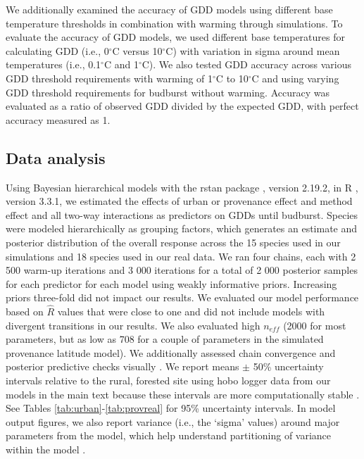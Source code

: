 \documentclass{article}\usepackage[]{graphicx}\usepackage[]{color}
\begin{document}
We additionally examined the accuracy of GDD models using different base temperature thresholds in combination with warming through simulations. To evaluate the accuracy of GDD models, we used different base temperatures for calculating GDD (i.e., 0$^{\circ}$C versus 10$^{\circ}$C) with variation in sigma around mean temperatures (i.e., 0.1$^{\circ}$C and 1$^{\circ}$C). We also tested GDD accuracy across various GDD threshold requirements with warming of 1$^{\circ}$C to 10$^{\circ}$C and using varying GDD threshold requirements for budburst without warming. Accuracy was evaluated as a ratio of observed GDD divided by the expected GDD, with perfect accuracy measured as 1.

\subsection*{Data analysis}
Using Bayesian hierarchical models with the rstan package \citep{rstan2019}, version 2.19.2,  in R \citep{R}, version 3.3.1, we estimated the effects of urban or provenance effect and method effect and all two-way interactions as predictors on GDDs until budburst. Species were modeled hierarchically as grouping factors, which generates an estimate and posterior distribution of the overall response across the 15 species used in our simulations and 18 species used in our real data. We ran four chains, each with 2 500 warm-up iterations and 3 000 iterations for a total of 2 000 posterior samples for each predictor for each model using weakly informative priors. Increasing priors three-fold did not impact our results. We evaluated our model performance based on $\hat{R}$ values that were close to one and did not include models with divergent transitions in our results. We also evaluated high $n_{eff}$ (2000 for most parameters, but as low as 708 for a couple of parameters in the simulated provenance latitude model). We additionally assessed chain convergence and posterior predictive checks visually \citep{BDA}. We report means $\pm$ 50\% uncertainty intervals relative to the rural, forested site using hobo logger data from our models in the main text because these intervals are more computationally stable \citep{BDA,Carpenter2017}. See Tables \ref{tab:urban}-\ref{tab:provreal} for 95\% uncertainty intervals. In model output figures, we also report variance (i.e., the `sigma' values) around major parameters from the model, which help understand partitioning of variance within the model \citep{BDA}. 
\end{document}
